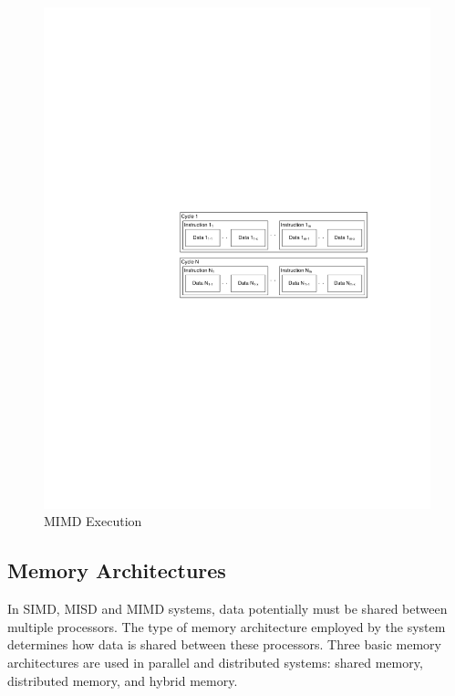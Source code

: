 \begin{figure}[ptb]
	\begin{centering}
		\includegraphics{Introduction/Figures/introduction-mimd.pdf}
		\caption{MIMD Execution}
		\label{fig:introduction:mimd}
	\end{centering}
\end{figure}

\subsection{Memory Architectures}\label{sec:introduction:parallel_computing_overview:memory_architectures}

In SIMD, MISD and MIMD systems, data potentially must be shared between multiple processors. The type of memory architecture employed by the system determines how data is shared between these processors. Three basic memory architectures are used in parallel and distributed systems: shared memory, distributed memory, and hybrid memory.

